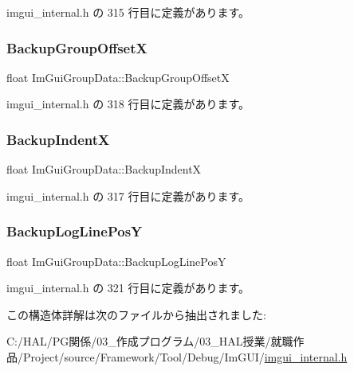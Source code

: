  imgui\+\_\+internal.\+h の 315 行目に定義があります。

\mbox{\label{struct_im_gui_group_data_a0cee1b14b574a4bf883ceb1be58a9332}} 
\subsubsection{\texorpdfstring{Backup\+Group\+OffsetX}{BackupGroupOffsetX}}
{\footnotesize\ttfamily float Im\+Gui\+Group\+Data\+::\+Backup\+Group\+OffsetX}



 imgui\+\_\+internal.\+h の 318 行目に定義があります。

\mbox{\label{struct_im_gui_group_data_a9d39092c1c154ba4809ae79e47baeb64}} 
\subsubsection{\texorpdfstring{Backup\+IndentX}{BackupIndentX}}
{\footnotesize\ttfamily float Im\+Gui\+Group\+Data\+::\+Backup\+IndentX}



 imgui\+\_\+internal.\+h の 317 行目に定義があります。

\mbox{\label{struct_im_gui_group_data_af67f52c70f74a3b7bce8ce46affc856b}} 
\subsubsection{\texorpdfstring{Backup\+Log\+Line\+PosY}{BackupLogLinePosY}}
{\footnotesize\ttfamily float Im\+Gui\+Group\+Data\+::\+Backup\+Log\+Line\+PosY}



 imgui\+\_\+internal.\+h の 321 行目に定義があります。



この構造体詳解は次のファイルから抽出されました\+:\begin{DoxyCompactItemize}
\item 
C\+:/\+H\+A\+L/\+P\+G関係/03\+\_\+作成プログラム/03\+\_\+\+H\+A\+L授業/就職作品/\+Project/source/\+Framework/\+Tool/\+Debug/\+Im\+G\+U\+I/\mbox{\hyperlink{imgui__internal_8h}{imgui\+\_\+internal.\+h}}\end{DoxyCompactItemize}
